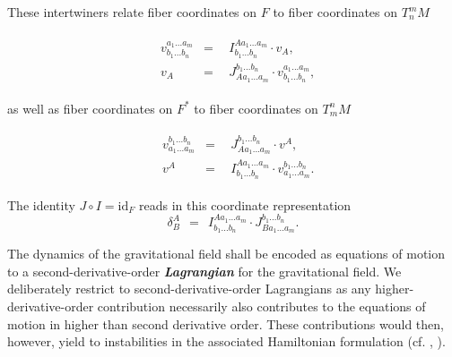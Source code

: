 \documentclass[%
 reprint,
nofootinbib,
 amsmath,amssymb,
 aps,
 prd,
floatfix,
]{revtex4-2}
\begin{document}
These intertwiners relate fiber coordinates on $F$ to fiber coordinates on $T^m_nM$

\begin{align} \label{interRel1}
    \begin{aligned}
    & v^{a_1 ... a_m}_{b_1 ... b_n} & = & \ \ I^{A a_1 ... a_m}_{b_1 ... b_n} \cdot v_{A},\\  
    & v_A & = & \ \ J^{b_1 ... b_n}_{A a_1 ... a_m} \cdot v^{a_1 ... a_m}_{b_1 ... b_n},
    \end{aligned}
\end{align}

as well as fiber coordinates on $F^\ast$ to fiber coordinates on $T^n_mM$

\begin{align} \label{interRel2}
    \begin{aligned}
    & v^{b_1 ... b_n}_{a_1 ... a_m} & = & \ \ J^{b_1 ... b_n}_{A a_1 ... a_m} \cdot v^{A},\\  
    & v^A & = & \ \  I^{A a_1 ... a_m}_{b_1 ... b_n} \cdot v^{b_1 ... b_n}_{a_1 ... a_m}.
    \end{aligned}
\end{align}

The identity $J\circ I = \mathrm{id}_F$ reads in this coordinate representation
\begin{equation}
    \delta^A _ B \ \ = \ \ I^{A a_1 ... a_m}_{b_1 ... b_n} \cdot J^{b_1 ... b_n}_{B a_1 ... a_m}.  
\end{equation}

The dynamics of the gravitational field shall be encoded as equations of motion to a second-derivative-order \textit{\textbf{Lagrangian}} for the gravitational field. We deliberately restrict to second-derivative-order Lagrangians as any higher-derivative-order contribution necessarily also contributes to the equations of motion in higher than second derivative order. These contributions would then, however, yield to instabilities in the associated Hamiltonian formulation (cf. \cite{Ostrogradsky:1850fid}, \cite{2015arXiv150602210W}). 
\end{document}
